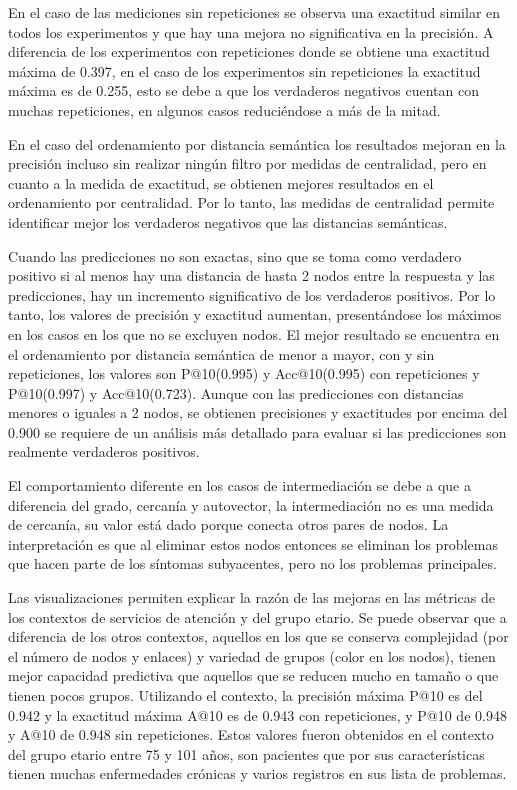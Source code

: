 En el caso de las mediciones sin repeticiones se observa una exactitud similar en todos los experimentos y que hay una mejora no significativa en la precisión. A diferencia de los experimentos con repeticiones donde se obtiene una exactitud máxima de \num{0,397}, en el caso de los experimentos sin repeticiones la exactitud máxima es de \num{0,255}, esto se debe a que los verdaderos negativos cuentan con muchas repeticiones, en algunos casos reduciéndose a más de la mitad.

En el caso del ordenamiento por distancia semántica  los resultados mejoran  en la precisión incluso sin realizar ningún filtro por medidas de centralidad, pero en cuanto a la medida de exactitud, se obtienen mejores resultados en el ordenamiento por centralidad. Por lo tanto, las medidas de centralidad permite identificar mejor los verdaderos negativos que las distancias semánticas.

Cuando las predicciones no son exactas, sino que se toma como verdadero positivo si al menos hay una distancia de hasta 2 nodos entre la respuesta y las predicciones, hay un incremento significativo de los verdaderos positivos. Por lo tanto, los valores de precisión y exactitud aumentan, presentándose los máximos en los casos en los que no se excluyen nodos.  El mejor resultado se encuentra en el ordenamiento por distancia semántica de menor a mayor, con y sin repeticiones, los valores son  P@10(\num{0,995}) y Acc@10(\num{0,995}) con repeticiones y P@10(\num{0,997}) y Acc@10(\num{0,723}).  Aunque con las predicciones con distancias menores o iguales a 2 nodos, se obtienen precisiones y exactitudes por encima del \num{0.900} se requiere de un análisis más detallado para evaluar si las predicciones son realmente verdaderos positivos. 

El comportamiento diferente en los casos de intermediación se debe a que a diferencia del grado, cercanía y autovector, la intermediación no es una medida de cercanía, su valor está dado porque conecta otros pares de nodos. La interpretación es que al eliminar estos nodos entonces se eliminan los problemas que hacen parte de los síntomas subyacentes, pero no los problemas principales.

Las visualizaciones permiten explicar la razón de las mejoras en las métricas de los contextos de servicios de atención y del grupo etario. Se puede observar que a diferencia de los otros contextos, aquellos en los que se conserva complejidad (por el número de nodos y enlaces) y variedad de grupos (color en los nodos), tienen mejor capacidad predictiva que aquellos que se reducen mucho en tamaño o que tienen pocos grupos. Utilizando el contexto, la precisión máxima P@10 es del \num{0.942} y la exactitud máxima A@10 es de \num{0.943} con repeticiones, y  P@10 de \num{0.948} y A@10 de \num{0.948} sin repeticiones. Estos valores fueron obtenidos en el contexto del grupo etario entre 75 y 101 años, son pacientes que por sus características tienen muchas enfermedades crónicas y varios registros en sus lista de problemas. 

